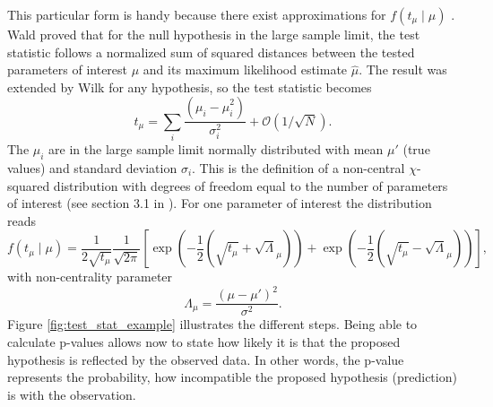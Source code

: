 This particular form is handy because there exist approximations for $f(t_\mu \mid \mu)$ \citep{cowan2011asymptotic}. Wald \citep{wald1943tests} proved that for the null hypothesis in the large sample limit, the test statistic follows a normalized sum of squared distances between the tested parameters of interest $\mu$ and its maximum likelihood estimate $\hat{\mu}$. The result was extended by Wilk \citep{wilks1938large} for any hypothesis, so the test statistic becomes
\begin{equation}
    t_\mu=\sum_i \frac{(\mu_i-\hat{\mu}_i^2)}{\sigma_i^2} + \mathcal{O}(1/\sqrt{N}).
\end{equation}
The $\hat{\mu}_i$ are in the large sample limit normally distributed with mean $\mu'$ (true values) and standard deviation $\sigma_i$. This is the definition of a non-central $\chi$-squared distribution with degrees of freedom equal to the number of parameters of interest (see section 3.1 in \citep{cowan2011asymptotic}). For one parameter of interest the distribution reads
\begin{equation}\label{eq:chi-square}
    f(t_\mu \mid \mu)=\frac{1}{2\sqrt{t_\mu}}\frac{1}{\sqrt{2\pi}}
    \left[
\exp\left(-\frac{1}{2}\left(\sqrt{t_\mu}+\sqrt{\Lambda}_\mu\right)\right)
+
\exp\left(-\frac{1}{2}\left(\sqrt{t_\mu}-\sqrt{\Lambda}_\mu\right)\right)
\right],
\end{equation}
with non-centrality parameter 
\begin{equation}
    \Lambda_\mu=\frac{(\mu-\mu')^2}{\sigma^2}.
\end{equation}
Figure \ref{fig:test_stat_example} illustrates the different steps. Being able to calculate p-values allows now to state how likely it is that the proposed hypothesis is reflected by the observed data. In other words, the p-value represents the probability, how incompatible the proposed hypothesis (prediction) is with the observation.

